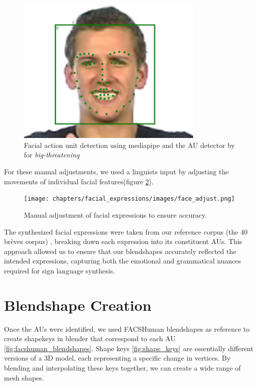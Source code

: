 \documentclass[../../main.tex]{subfiles}
\begin{document}
\begin{figure}
    \centering
    \includegraphics[width=0.8\textwidth]{chapters/facial_expressions/images/face_detect.png}
    \caption{Facial action unit detection using mediapipe and the AU detector by \cite{luo2022learning} for \emph{big-threatening}}
    \label{fig:face_detect}
\end{figure}

For these manual adjustments, we used a linguists input by adjusting the movements of individual facial features(figure \ref{fig:face_adjust}).

\begin{figure}
    \centering
    \texttt{[image: chapters/facial\_expressions/images/face\_adjust.png]}
    \caption{Manual adjustment of facial expressions to ensure accuracy.}
    \label{fig:face_adjust}
\end{figure}

The synthesized facial expressions were taken from our reference corpus (the 40 brèves corpus) \cite{challant2024extending} \cite{challant2022first}, breaking down each expression into its constituent AUs. This approach allowed us to ensure that our blendshapes accurately reflected the intended expressions, capturing both the emotional and grammatical nuances required for sign language synthesis.

\section{Blendshape Creation}
\label{ch:facial_expressions:blendshape_creation}

Once the AUs were identified, we used FACSHuman \cite{gilbert2021facshuman} blendshapes as reference to create shapekeys in blender that correspond to each AU \ref{fig:facshuman_blendshapes}. Shape keys \ref{fig:shape_keys} are essentially different versions of a 3D model, each representing a specific change in vertices. By blending and interpolating these keys together, we can create a wide range of mesh shapes.
\end{document}
